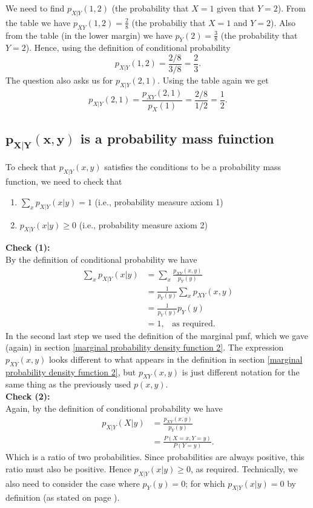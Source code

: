 \solution
We need to find $p_{X|Y}(1,2)$ (the probability that $X = 1$ given that $Y = 2$). From the table we have $p_{XY}(1,2) = \frac{2}{8}$ (the probabiliy that $X = 1$ and $Y = 2$). Also from the table (in the lower margin) we have $p_Y(2) = \frac{3}{8}$ (the probability that $Y = 2$). Hence, using the definition of conditional probability
\[
p_{X|Y}(1,2) = \frac{2/8}{3/8} = \frac{2}{3}.
\]
The question also asks us for $p_{X|Y}(2,1)$. Using the table again we get
\[
p_{X|Y}(2,1) = \frac{p_{XY}(2,1)}{p_X(1)} = \frac{2/8}{1/2} = \frac{1}{2}.
\]

\subsection{$\boldsymbol{p_{X|Y}(x,y)}$ is a probability mass fuinction}
To check that $p_{X|Y}(x,y)$ satisfies the conditions to be a probability mass function, we need to check that
\begin{enumerate}
\item $\displaystyle{\sum_xp_{X|Y}(x|y) = 1}$ \;\; (i.e., probability measure axiom 1)
\item $\displaystyle{p_{X|Y}(x|y) \geq 0}$ \;\; (i.e., probability measure axiom 2)
\end{enumerate}
\smallskip
\noindent \textbf{Check (1):} \\
By the definition of conditional probability we have
\begin{align*}
\sum_xp_{X|Y}(x|y) & = \sum_x \frac{p_{XY}(x,y)}{p_Y(y)} \\
	& = \frac{1}{p_Y(y)} \sum_x p_{XY}(x,y) \tag{since we sum with respect to $x$, not $y$} \\
	& = \frac{1}{p_Y(y)} p_Y(y) \tag{by definition of the marginal pmf $p_Y(y)$} \\
	& = 1, \;\;\; \text{as required.}
\end{align*}
In the second last step we used the definition of the marginal pmf, which we gave (again) in section \ref{marginal probability density function 2}. The expression $p_{XY}(x,y)$ looks different to what appears in the definition in section \ref{marginal probability density function 2}, but $p_{XY}(x,y)$ is just different notation for the same thing as the previously used $p(x,y)$.  \\

\noindent \textbf{Check (2):} \\
Again, by the definition of conditional probability we have
\begin{align*}
p_{X|Y}(X|y) & = \frac{p_{XY}(x,y)}{p_Y(y)} \\
	& = \frac{P(X = x,Y = y)}{P(Y = y)}.
\end{align*}
Which is a ratio of two probabilities. Since probabilities are always positive, this ratio must also be positive. Hence $p_{X|Y}(x|y) \geq 0$, as required. Technically, we also need to consider the case where $p_Y(y) = 0$; for which $p_{X|Y}(x|y) = 0$ by definition (as stated on page \pageref{sec27.2}).


